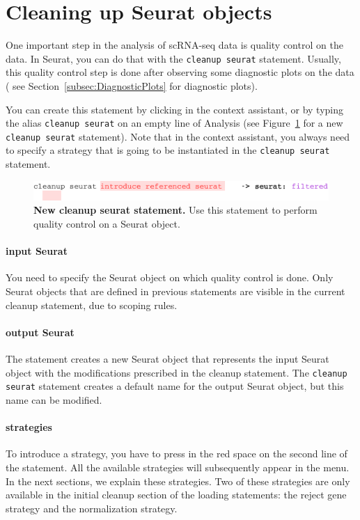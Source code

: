\section{Cleaning up Seurat objects}\label{sec:CleanupSeurat}
One important step in the analysis of scRNA-seq data is quality control on the data. In
Seurat, you can do that with the \texttt{cleanup seurat} statement. Usually, this
quality control step is done after observing some diagnostic plots on the data (
see Section~\ref{subsec:DiagnosticPlots} for diagnostic plots).

You can create this statement by clicking  in the context assistant,
or by typing the alias \texttt{cleanup seurat} on an empty line of Analysis (see
Figure~\ref{fig:CleanupSeurat} for a new \texttt{cleanup seurat} statement). Note that in
the context assistant, you always need to specify a strategy that is going to be instantiated
in the \texttt{cleanup seurat} statement.

\begin{figure}[h!tbp]
  \centering
  \includegraphics[width=\figWidthWide]{figures/CleanupSeurat.pdf}
    \caption[New cleanup seurat statement.]{\textbf{New cleanup seurat statement.}
    Use this statement to perform quality control on a Seurat object.}
\label{fig:CleanupSeurat}
\end{figure}

\paragraph{input Seurat} You need to specify the Seurat object on which quality control
is done. Only Seurat objects that are defined in previous statements are visible in the
current cleanup statement, due to scoping rules.

\paragraph{output Seurat} The statement creates a new Seurat object that represents the
input Seurat object with the modifications prescribed in the cleanup statement. The
\texttt{cleanup seurat} statement creates a default name for the output Seurat object,
but this name can be modified.

\paragraph{strategies} To introduce a strategy, you have to press \keys{\ctrl+\space}
in the red space on the second line of the statement. All the available strategies will
subsequently appear in the menu. In the next sections, we explain these strategies. Two
of these strategies are only available in the initial cleanup section of the loading
statements: the reject gene strategy and the normalization strategy.

